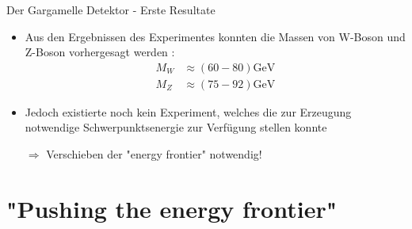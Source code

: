 \documentclass[aspectratio=1610, professionalfonts, 10pt]{beamer}
\begin{document}
\begin{frame}{Der Gargamelle Detektor - Erste Resultate}
		\begin{itemize}
			\setlength\itemsep{0.5em}
			\item Aus den Ergebnissen des Experimentes konnten die Massen von W-Boson und Z-Boson vorhergesagt werden \cite{doi:10.1142/9789814644150_0006}:
			\begin{align*}
				M_W &\approx \left(60-80\right)\si{\giga\electronvolt}\\
				M_Z &\approx \left(75-92\right)\si{\giga\electronvolt}
			\end{align*}
			\item Jedoch existierte noch kein Experiment, welches die zur Erzeugung notwendige Schwerpunktsenergie zur Verfügung stellen konnte
			\item[$\Rightarrow$]Verschieben der "energy frontier" notwendig!

		\end{itemize}
\end{frame}

\section{"Pushing the energy frontier"}
\end{document}
